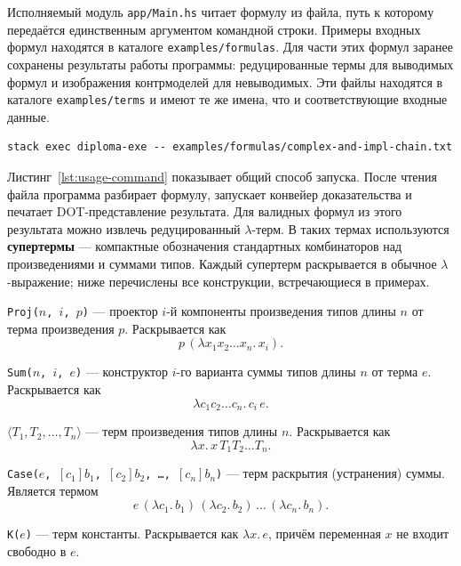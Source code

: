 \documentclass[14pt, russian]{scrartcl}
\begin{document}
Исполняемый модуль \texttt{app/Main.hs} читает формулу из файла, путь к которому
передаётся единственным аргументом командной строки. Примеры входных формул
находятся в каталоге \texttt{examples/formulas}. Для части этих формул заранее
сохранены результаты работы программы: редуцированные термы для выводимых формул
и изображения контрмоделей для невыводимых. Эти файлы находятся в каталоге
\texttt{examples/terms} и имеют те же имена, что и соответствующие входные
данные.

\begin{listing}[!htb]
\caption{Запуск программы на файле с формулой}
\label{lst:usage-command}
\begin{verbatim}
stack exec diploma-exe -- examples/formulas/complex-and-impl-chain.txt
\end{verbatim}
\end{listing}

Листинг~\ref{lst:usage-command} показывает общий способ запуска. После чтения
файла программа разбирает формулу, запускает конвейер доказательства и печатает
DOT-представление результата. Для валидных формул из этого результата можно
извлечь редуцированный $\lambda$-терм. В таких термах используются
\textbf{супертермы} --- компактные обозначения стандартных комбинаторов над
произведениями и суммами типов. Каждый супертерм раскрывается в обычное
$\lambda$-выражение; ниже перечислены все конструкции, встречающиеся в
примерах.

\texttt{Proj($n$, $i$, $p$)} --- проектор $i$-й компоненты произведения
  типов длины $n$ от терма произведения $p$. Раскрывается как
  \[
    p\,(\lambda x_1 x_2 \ldots x_n.\, x_i).
  \]

\texttt{Sum($n$, $i$, $e$)} --- конструктор $i$-го варианта суммы типов
  длины $n$ от терма $e$. Раскрывается как
  \[
    \lambda c_1 c_2 \ldots c_n.\, c_i\, e.
  \]

$\langle T_1, T_2, \ldots, T_n \rangle$ --- терм произведения типов
  длины $n$. Раскрывается как
  \[
    \lambda x.\, x\, T_1 T_2 \ldots T_n.
  \]

\texttt{Case($e$, $[c_1]b_1$, $[c_2]b_2$, \ldots, $[c_n]b_n$)} --- терм
  раскрытия (устранения) суммы. Является термом
  \[
    e\,(\lambda c_1.\, b_1)\,(\lambda c_2.\, b_2)\,\ldots\,(\lambda c_n.\, b_n).
  \]

\texttt{K($e$)} --- терм константы. Раскрывается как $\lambda x.\, e$,
  причём переменная $x$ не входит свободно в $e$.
\end{document}

